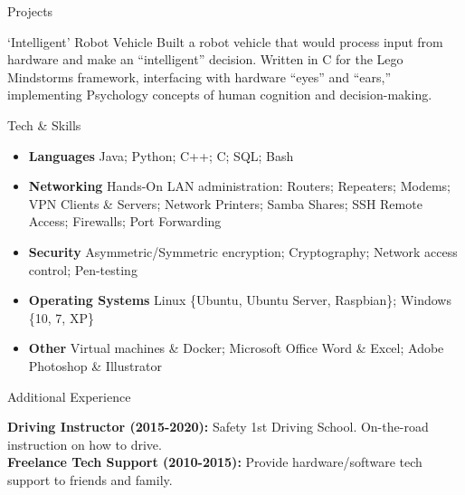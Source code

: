 \documentclass[]{mcdowellcv}
\begin{document}
\begin{cvsection}{Projects}
		\begin{cvsubsection}{‘Intelligent’ Robot Vehicle}{}{}		
			Built a robot vehicle that would process input from hardware and make an “intelligent” decision. \newline  
			Written in C for the Lego Mindstorms framework, interfacing with hardware “eyes” and “ears,” \newline 
			implementing Psychology concepts of human cognition and decision-making. 
		\end{cvsubsection}
	\end{cvsection}
	
	\begin{cvsection}{Tech \& Skills}
		\begin{cvsubsection}{}{}{}
			\begin{itemize}[itemsep=6pt]
				\item \textbf{Languages} Java; Python; C++; C; SQL; Bash 
				\item \textbf{Networking} Hands-On LAN administration: Routers; Repeaters; Modems; VPN Clients \& Servers; Network Printers; Samba Shares; SSH Remote Access; Firewalls; Port Forwarding 
				\item \textbf{Security} Asymmetric/Symmetric encryption; Cryptography; Network access control; Pen-testing
				\item \textbf{Operating Systems} Linux \{Ubuntu, Ubuntu Server, Raspbian\}; Windows \{10, 7, XP\}
				\item \textbf{Other} Virtual machines \& Docker; Microsoft Office Word \& Excel; Adobe Photoshop \& Illustrator
			\end{itemize}
		\end{cvsubsection}
	\end{cvsection}
	
	\begin{cvsection}{Additional Experience}
		\begin{cvsubsection}{}{}{}	
			\textbf{Driving Instructor (2015-2020):} Safety 1st Driving School. On-the-road instruction on how to drive.\\
			\textbf{Freelance Tech Support (2010-2015):} Provide hardware/software tech support to friends and family.
		\end{cvsubsection}
	\end{cvsection}
	
\end{document}
